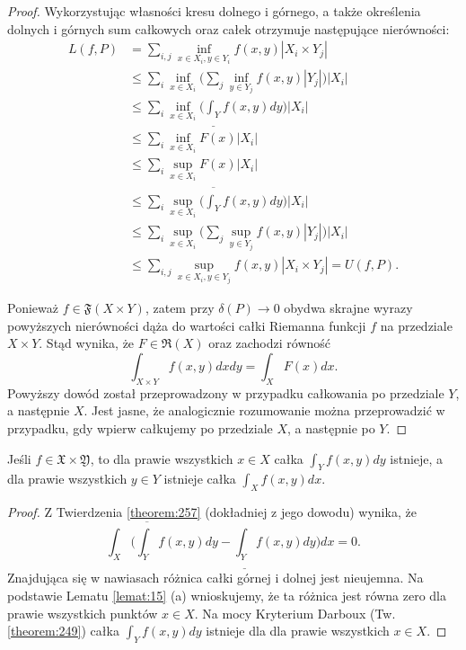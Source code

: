 \documentclass[leqno]{article}
\begin{document}
\begin{justify}
\begin{proof}
    Wykorzystując własności kresu dolnego i górnego, a także określenia dolnych i górnych sum całkowych oraz całek otrzymuje następujące nierówności:
    \[
        \begin{aligned}
            L(f, P) &= \sum_{i,j}\inf_{x \in X_i, y \in Y_i}f(x,y)|X_i \times Y_j| \\
                    &\leqslant \sum_{i}\inf_{x \in X_i}\Big(\sum_{j} \inf_{y \in Y_j} f(x,y) |Y_j| \Big)|X_i| \\
                    &\leqslant \sum_{i}\inf_{x \in X_i}\Big( \underline{\int_Y} f(x,y)dy \Big)|X_i| \\
                    &\leqslant \sum_i \inf_{x \in X_i}F(x)|X_i| \\
                    &\leqslant \sum_i \sup_{x \in X_i}F(x)|X_i| \\
                    &\leqslant \sum_i \sup_{x \in X_i}\Big( \overline{\int_Y} f(x,y)dy\Big) |X_i| \\
                    &\leqslant \sum_i \sup_{x \in X_i}\Big( \sum_j \sup_{y \in Y_j}f(x,y) |Y_j| \Big)|X_i| \\
                    &\leqslant \sum_{i,j}\sup_{x \in X_i, y \in Y_j}f(x,y)|X_i \times Y_j| = U(f, P).
        \end{aligned}
    \]

    Ponieważ $f \in \mathfrak{F}(X \times Y)$, zatem przy $\delta(P) \to 0$ obydwa skrajne wyrazy powyższych nierówności dąża do wartości całki Riemanna funkcji $f$
    na przedziale $X \times Y$. Stąd wynika, że $F \in \mathfrak{R}(X)$ oraz zachodzi równość 
    \[
        \int_{X \times Y}f(x,y)dxdy = \int_X F(x)dx.
    \]
    Powyższy dowód został przeprowadzony w przypadku całkowania po przedziale $Y$, a następnie $X$. Jest jasne, że 
    analogicznie rozumowanie można przeprowadzić w przypadku, gdy wpierw całkujemy po przedziale $X$, a następnie po $Y$.
\end{proof}

\begin{wniosek}
{
    Jeśli $f \in \mathfrak{X \times Y}$, to dla prawie wszystkich $x \in X$ całka $\int_Y f(x,y)dy$ istnieje, a dla 
    prawie wszystkich $y \in Y$ istnieje całka $\int_X f(x,y)dx$.
}
\end{wniosek}

\begin{proof}
    Z Twierdzenia \ref{theorem:257} (dokładniej z jego dowodu) wynika, że 
    \[
        \int_X \Big(\overline{\int_Y}f(x,y)dy - \underline{\int_Y}f(x,y)dy\Big)dx = 0.
    \]
    Znajdująca się w nawiasach różnica całki górnej i dolnej jest nieujemna. Na podstawie Lematu \ref{lemat:15} (a) wnioskujemy, że ta 
    różnica jest równa zero dla prawie wszystkich punktów $x \in X$. Na mocy Kryterium Darboux (Tw. \ref{theorem:249}) całka 
    $\int_Y f(x,y)dy$ istnieje dla dla prawie wszystkich $x \in X$.
\end{proof}


\end{justify}
\end{document}

